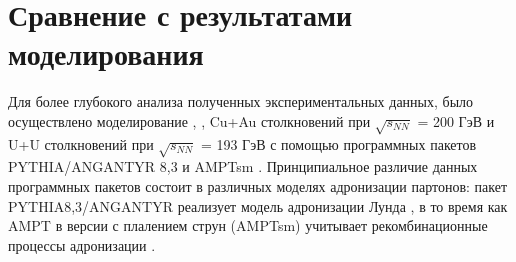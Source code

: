 \newpage
\section{Сравнение с результатами моделирования} \label{sect5_spectra}

Для более глубокого анализа полученных экспериментальных данных, было осуществлено моделирование \pal, \heau, Cu+Au столкновений при $\sqrt{s_{NN}}$ = 200 ГэВ и U+U столкновений при $\sqrt{s_{NN}}$ = 193 ГэВ с помощью программных пакетов PYTHIA/ANGANTYR 8,3 \cite{pythia} и AMPTsm \cite{AMPT}.
Принципиальное различие данных программных пакетов состоит в различных моделях адронизации партонов: пакет PYTHIA8,3/ANGANTYR \cite{pythia} реализует модель адронизации Лунда \cite{FragmentationLund}, в то время как AMPT \cite{AMPT} в версии с плалением струн (AMPTsm) учитывает рекомбинационные процессы адронизации \cite{Recombination1, Recombination2}.

